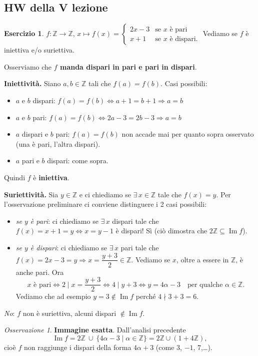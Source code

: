 \documentclass[11pt,a4paper]{article}
\newcommand{\Z}{\mathbb{Z}}
\newcommand{\im}{\operatorname{Im}}
\theoremstyle{definition}
\newtheorem{esercizio}[definizione]{Esercizio}
\theoremstyle{plain}
\theoremstyle{remark}
\newtheorem*{osservazione}{Osservazione}
\begin{document}
\subsection{HW della V lezione}

\begin{esercizio}\label{es:HWZ}
$f\colon\Z\to\Z$, \quad $x\mapsto f(x)=\begin{cases}2x-3&\text{se }x\text{ \`e pari}\\ x+1&\text{se }x\text{ \`e dispari.}\end{cases}$
Vediamo se $f$ \`e iniettiva e/o suriettiva.
\end{esercizio}

Osserviamo che \textbf{$f$ manda dispari in pari e pari in dispari}.

\textbf{Iniettivit\`a.} Siano $a,b\in\Z$ tali che $f(a)=f(b)$. Casi possibili:
\begin{itemize}
\item $a$ e $b$ dispari: $f(a)=f(b)\iff a+1=b+1\Rightarrow a=b$ \ \checkmark
\item $a$ e $b$ pari: $f(a)=f(b)\iff 2a-3=2b-3\Rightarrow a=b$ \ \checkmark
\item $a$ dispari e $b$ pari: $f(a)=f(b)$ non accade mai per quanto sopra osservato (una \`e pari, l'altra dispari).
\item $a$ pari e $b$ dispari: come sopra.
\end{itemize}
Quindi $f$ \`e \textbf{iniettiva}.

\textbf{Suriettivit\`a.} Sia $y\in\Z$ e ci chiediamo se $\exists\,x\in\Z$ tale che $f(x)=y$. Per l'osservazione preliminare ci conviene distinguere i 2 casi possibili:
\begin{itemize}
\item \emph{se $y$ \`e pari}: ci chiediamo se $\exists\,x$ dispari tale che $f(x)=x+1=y\iff x=y-1$ \`e dispari! S\`i (ci\`o dimostra che $2\Z\subseteq\im f$).
\item \emph{se $y$ \`e dispari}: ci chiediamo se $\exists\,x$ pari tale che $f(x)=2x-3=y\Rightarrow x=\dfrac{y+3}{2}\in\Z$. Vediamo se $x$, oltre a essere in $\Z$, \`e anche pari. Ora
\[
x\text{ \`e pari}\iff 2\mid x=\frac{y+3}{2}\iff 4\mid y+3\iff y=4\alpha-3\quad\text{per qualche }\alpha\in\Z.
\]
Vediamo che ad esempio $y=3\notin\im f$ perch\'e $4\nmid 3+3=6$.
\end{itemize}
\emph{No}: $f$ non \`e suriettiva, alcuni dispari $\notin\im f$.

\begin{osservazione}
\textbf{Immagine esatta}. 
Dall'analisi precedente
\[
\im f=2\Z\ \cup\ \{4\alpha-3\mid\alpha\in\Z\}=2\Z\cup(1+4\Z),
\]
cio\`e $f$ non raggiunge i dispari della forma $4\alpha+3$ (come $3$, $-1$, $7$,\dots).
\end{osservazione}
\end{document}
